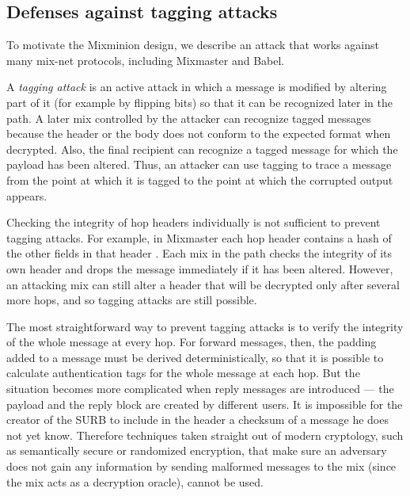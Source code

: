 \documentclass[11pt]{IEEEtran}
\begin{document}
\subsection{Defenses against tagging attacks}
\label{subsec:tagging-attacks}
\label{subsec:tagging-defenses}

To motivate the Mixminion design, we describe an attack
that works against many mix-net protocols, including Mixmaster and Babel.

A {\em tagging attack} is an active attack in which a message is
modified by altering part of it (for example by flipping bits) so
that it can be recognized later in the path.  A later mix controlled by
the attacker can recognize tagged messages because the header or the
body does
not conform to the expected format when decrypted.  Also, the final
recipient can recognize a tagged message for which the payload has
been altered.  Thus, an attacker can use tagging to trace a message from the
point at which it is tagged to the point at which the corrupted output
appears. 

Checking the integrity of hop headers individually is not
sufficient to prevent tagging attacks.  For example, in Mixmaster
each hop header contains a hash of the other fields in that header
\cite{mixmaster-spec}.
Each mix in the path checks the integrity of its own header and drops
the message immediately if it has been altered.  However, 
an attacking mix can still alter a header that will be decrypted
only after several more hops, and so tagging attacks are still possible.

The most straightforward way to prevent tagging attacks is to
verify the integrity of the whole message at every hop.  For forward messages,
then, the padding added to a message must be derived deterministically,
so that it is possible to calculate
authentication tags for the whole message at each hop.  But
the situation becomes more complicated when reply messages are
introduced --- the payload and the reply block are
created by different users. It is impossible for the creator
of the SURB to include in the header a checksum of a message he
does not yet know. Therefore techniques taken straight out of modern
cryptology, such as semantically secure or randomized encryption, that
make sure an adversary does not gain any information by sending
malformed messages to the mix (since the mix acts as a decryption oracle),
cannot be used.
\end{document}
